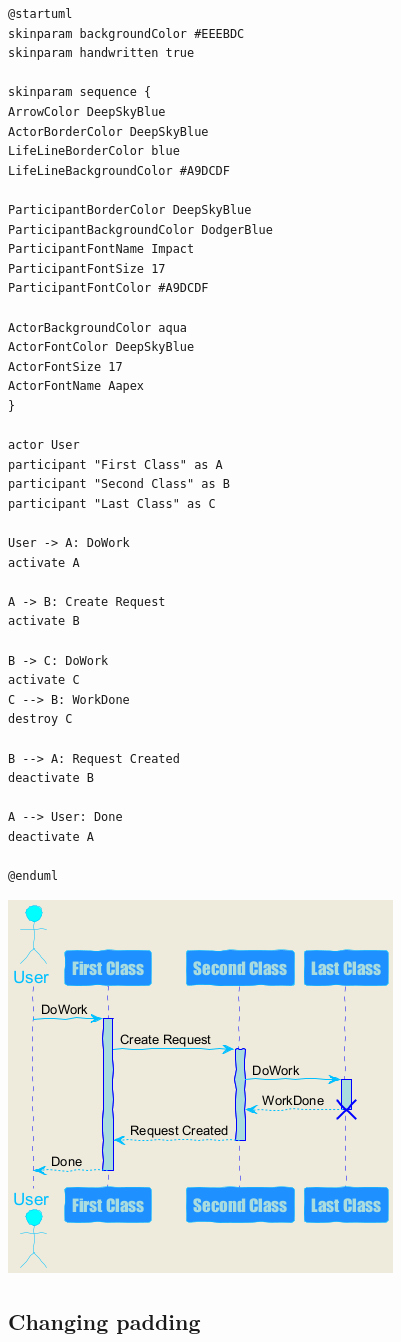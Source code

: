\begin{verbatim}
@startuml
skinparam backgroundColor #EEEBDC
skinparam handwritten true

skinparam sequence {
ArrowColor DeepSkyBlue
ActorBorderColor DeepSkyBlue
LifeLineBorderColor blue
LifeLineBackgroundColor #A9DCDF

ParticipantBorderColor DeepSkyBlue
ParticipantBackgroundColor DodgerBlue
ParticipantFontName Impact
ParticipantFontSize 17
ParticipantFontColor #A9DCDF

ActorBackgroundColor aqua
ActorFontColor DeepSkyBlue
ActorFontSize 17
ActorFontName Aapex
}

actor User
participant "First Class" as A
participant "Second Class" as B
participant "Last Class" as C

User -> A: DoWork
activate A

A -> B: Create Request
activate B

B -> C: DoWork
activate C
C --> B: WorkDone
destroy C

B --> A: Request Created
deactivate B

A --> User: Done
deactivate A

@enduml
\end{verbatim}
\begin{center}
\includegraphics[scale=0.60]{imgw/img-9d207922fcde3e2dc4a7fe944f883b38.png}
\end{center}




%
%
\subsection{Changing padding}





